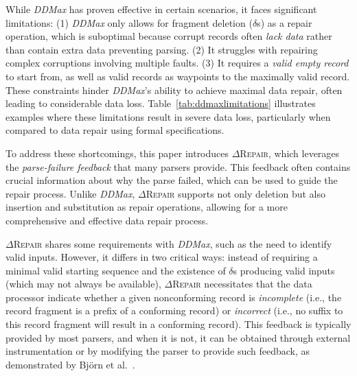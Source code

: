 \documentclass[acmsmall,screen,review,anonymous]{acmart}
\newcommand{\dtask}{data repair\xspace}
\newcommand{\approach}{\textsc{$\Delta$Repair}\xspace}
\newcommand{\ddmax}{\textit{DDMax}\xspace}
\newcommand{\drepair}{\approach}
\begin{document}
While \ddmax has proven effective in certain scenarios, it faces significant
limitations: (1) \ddmax only allows for fragment deletion ($\delta$s) as a
repair operation, which is suboptimal because corrupt records often \emph{lack
data} rather than contain extra data preventing parsing. (2) It struggles with
repairing complex corruptions involving multiple faults. (3) It requires a
\emph{valid empty record} to start from, as well as valid records as waypoints
to the maximally valid record. These constraints hinder \ddmax's ability to
achieve maximal data repair, often leading to considerable data loss.
Table~\ref{tab:ddmaxlimitations} illustrates examples where these limitations result in severe
data loss, particularly when compared to \dtask using formal specifications.

To address these shortcomings, this paper introduces \drepair, which leverages
the \emph{parse-failure feedback} that many parsers provide. This feedback
often contains crucial information about why the parse failed, which can be
used to guide the repair process. Unlike \ddmax, \drepair supports not only
deletion but also insertion and substitution as repair operations, allowing for
a more comprehensive and effective data repair process.

\drepair shares some requirements with \ddmax, such as the need to identify
valid inputs. However, it differs in two critical ways: instead of requiring a
minimal valid starting sequence and the existence of $\delta$s producing valid
inputs (which may not always be available), \drepair necessitates that the data
processor indicate whether a given nonconforming record is \emph{incomplete}
(i.e., the record fragment is a prefix of a conforming record) or
\emph{incorrect} (i.e., no suffix to this record fragment will result in a
conforming record). This feedback is typically provided by most parsers, and
when it is not, it can be obtained through external instrumentation or by
modifying the parser to provide such feedback, as demonstrated by Björn et
al.~\cite{mathis2019parser}.

\end{document}
